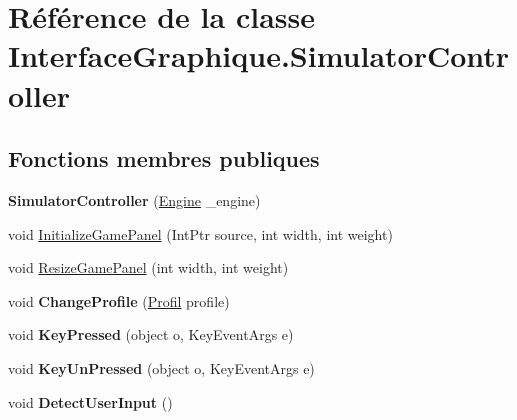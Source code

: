 \hypertarget{class_interface_graphique_1_1_simulator_controller}{\section{Référence de la classe Interface\-Graphique.\-Simulator\-Controller}
\label{class_interface_graphique_1_1_simulator_controller}
}
\subsection*{Fonctions membres publiques}
\begin{DoxyCompactItemize}
\item 
\hypertarget{class_interface_graphique_1_1_simulator_controller_acdb410a7c784b12d70e0f3d81eb2e236}{{\bfseries Simulator\-Controller} (\hyperlink{class_interface_graphique_1_1_engine}{Engine} \-\_\-engine)}\label{class_interface_graphique_1_1_simulator_controller_acdb410a7c784b12d70e0f3d81eb2e236}

\item 
void \hyperlink{class_interface_graphique_1_1_simulator_controller_a744b2a357e9f948047a89a036991a055}{Initialize\-Game\-Panel} (Int\-Ptr source, int width, int weight)
\item 
void \hyperlink{class_interface_graphique_1_1_simulator_controller_aabaeed81bb5cdc88fe558cb8b1985b85}{Resize\-Game\-Panel} (int width, int weight)
\item 
\hypertarget{class_interface_graphique_1_1_simulator_controller_aa251be26ce805e5b53ba99d63986ecac}{void {\bfseries Change\-Profile} (\hyperlink{class_interface_graphique_1_1_profil}{Profil} profile)}\label{class_interface_graphique_1_1_simulator_controller_aa251be26ce805e5b53ba99d63986ecac}

\item 
\hypertarget{class_interface_graphique_1_1_simulator_controller_abd1db2c12be45777f5f48bc19aca26b7}{void {\bfseries Key\-Pressed} (object o, Key\-Event\-Args e)}\label{class_interface_graphique_1_1_simulator_controller_abd1db2c12be45777f5f48bc19aca26b7}

\item 
\hypertarget{class_interface_graphique_1_1_simulator_controller_ab55398431fcef5360cc539a602a39fef}{void {\bfseries Key\-Un\-Pressed} (object o, Key\-Event\-Args e)}\label{class_interface_graphique_1_1_simulator_controller_ab55398431fcef5360cc539a602a39fef}

\item 
\hypertarget{class_interface_graphique_1_1_simulator_controller_a1ea89f304d6a50dab2c16c217e524f86}{void {\bfseries Detect\-User\-Input} ()}\label{class_interface_graphique_1_1_simulator_controller_a1ea89f304d6a50dab2c16c217e524f86}


\end{DoxyCompactItemize}
